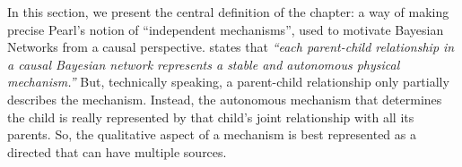 In this section, we present the central definition of the chapter: a way of making precise
Pearl's notion of ``independent mechanisms'', used to motivate Bayesian Networks from a causal perspective. 
%
%
states that
    \textit{%
    ``each parent-child relationship in a causal Bayesian network represents a
    stable and autonomous physical mechanism.''
    }%
%
But, technically speaking,
a parent-child relationship only partially describes
the mechanism.  Instead, the autonomous mechanism that determines the child is really represented by that child's joint relationship with all its parents.
So, the qualitative aspect of a mechanism is best represented as a directed \emph{\hyperarc}
that can have multiple sources.


